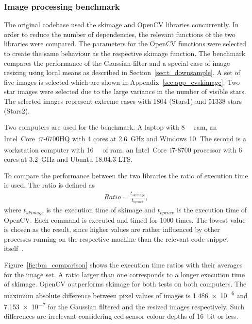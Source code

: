 \subsubsection{Image processing benchmark} \label{sec:cvskimage}
The original codebase used the \gls{skimage} and OpenCV libraries concurrently. In order to reduce the number of dependencies, the relevant functions of the two libraries were compared. The parameters for the OpenCV functions were selected to create the same behaviour as the respective \gls{skimage} function. The benchmark compares the performance of the Gaussian filter and a special case of image resizing using local means as described in Section~\ref{sec:t_downsample}. A set of five images is selected which are shown in Appendix~\ref{sec:app_cvskimage}. Two star images were selected due to the large variance in the number of visible stars. The selected images represent extreme cases with 1804 (Stars1) and 51338 stars (Stars2).

Two computers are used for the benchmark. A laptop with \SI{8}{\giga\byte} \gls{ram}, an Intel\textsuperscript{\textregistered}~Core\texttrademark~i7-6700HQ with \SI{4}{} cores at \SI{2.6}{\giga\hertz} and Windows 10. The second is a workstation computer with \SI{16}{\giga\byte} of \gls{ram}, an Intel\textsuperscript{\textregistered}~Core\texttrademark~i7-8700 processor with \SI{6}{} cores at \SI{3.2}{\giga\hertz} and Ubuntu 18.04.3 LTS.

To compare the performance between the two libraries the ratio of execution time is used. The ratio is defined as
\begin{align}
    Ratio = \frac{t_{skimage}}{t_{opencv}}, \label{eq:bm_exec_ratio}
\end{align}
where $t_{skimage}$ is the execution time of \gls{skimage} and $t_{opencv}$ is the execution time of OpenCV. Each command is executed and timed for 1000 times. The lowest value is chosen as the result, since higher values are rather influenced by other processes running on the respective machine than the relevant code snippet itself~\cite{timeit2020}.

Figure~\ref{fig:bm_comparison} shows the execution time ratios with their averages for the image set. A ratio larger than one corresponds to a longer execution time of \gls{skimage}. OpenCV outperforms \gls{skimage} for both tests on both computers. The maximum absolute difference between pixel values of images is \SI{1.486e-6}{} and \SI{7.153e-7}{} for the Gaussian filtered and the resized images respectively. Such differences are irrelevant considering \gls{ccd} sensor colour depths of \SI{16}{bit} or less.

